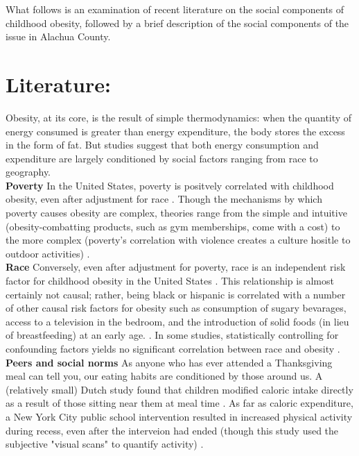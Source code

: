 \begin{multicols}{2}
What follows is an examination of recent literature on the social components of childhood obesity, followed by a brief description of the social components of the issue in Alachua County.

\section*{Literature: }

Obesity, at its core, is the result of simple thermodynamics: when the quantity of energy consumed is greater than energy expenditure, the body stores the excess in the form of fat.  But studies suggest that both energy consumption and expenditure are largely conditioned by social factors ranging from race to geography. \\

\textbf{Poverty} In the United States, poverty is positvely correlated with childhood obesity, even after adjustment for race \cite{Pan2012}.  Though the mechanisms by which poverty causes obesity are complex, theories range from the simple and intuitive (obesity-combatting products, such as gym memberships, come with a cost) to the more complex (poverty's correlation with violence creates a culture hositle to outdoor activities) \cite{Levine2011}.  \\

\textbf{Race} Conversely, even after adjustment for poverty, race is an independent risk factor for childhood obesity in the United States \cite{Ogden2014}.  This relationship is almost certainly not causal; rather, being black or hispanic is correlated with a number of other causal risk factors for obesity such as consumption of sugary bevarages, access to a television in the bedroom, and the introduction of solid foods (in lieu of breastfeeding) at an early age. \cite{Taveras2010}.  In some studies, statistically controlling for confounding factors yields no significant correlation between race and obesity \cite{Zilanawala2014}.   \\

\textbf{Peers and social norms} As anyone who has ever attended a Thanksgiving meal can tell you, our eating habits are conditioned by those around us.  A (relatively small) Dutch study found that children modified caloric intake directly as a result of those sitting near them at meal time \cite{Bevelander2012}.  As far as caloric expenditure, a New York City public school intervention resulted in increased physical activity during recess, even after the interveion had ended (though this study used the subjective "visual scans" to quantify activity)  \cite{Chin2013}.


\end{multicols}

